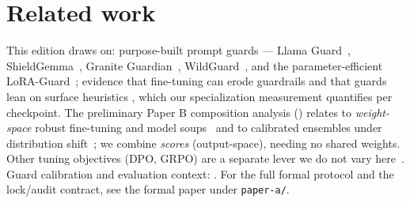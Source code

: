 \documentclass[11pt]{article}
\newcommand{\code}[1]{\texttt{\small #1}}
\begin{document}
\section*{Related work}
This edition draws on: purpose-built prompt guards --- Llama Guard~\cite{inan2023llamaguard},
ShieldGemma~\cite{zeng2024shieldgemma}, Granite Guardian~\cite{padhi2024graniteguardian},
WildGuard~\cite{han2024wildguard}, and the parameter-efficient LoRA-Guard~\cite{elesedy2024loraguard};
evidence that fine-tuning can erode guardrails and that guards lean on surface heuristics
\cite{hsiung2025guardrails,li2026surfaceheuristics,bassani2025robustness}, which our
specialization measurement quantifies per checkpoint. The preliminary Paper B composition analysis ()
relates to \emph{weight-space} robust fine-tuning and model soups~\cite{wortsman2022wiseft,wortsman2022modelsoups}
and to calibrated ensembles under distribution shift~\cite{kumar2022calibrated}; we combine
\emph{scores} (output-space), needing no shared weights. Other tuning objectives (DPO, GRPO) are
a separate lever we do not vary here~\cite{rafailov2023dpo,shao2024deepseekmath,vennemeyer2026objective}.
Guard calibration and evaluation context: \cite{guo2017calibration,liu2025calibration,bassani2024guardbench}.
For the full formal protocol and the lock/audit contract, see the formal paper under \code{paper-a/}.



\end{document}
